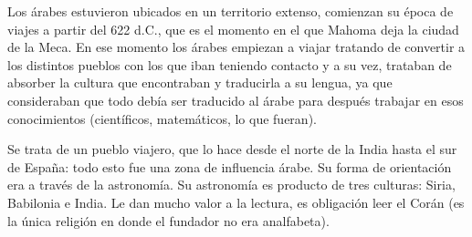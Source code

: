 Los árabes estuvieron ubicados en un territorio extenso, comienzan su época de viajes a partir del 622 d.C., que es el momento en el que Mahoma deja la ciudad de la Meca. En ese momento los árabes empiezan a viajar tratando de convertir a los distintos pueblos con los que iban teniendo contacto y a su vez, trataban de absorber la cultura que encontraban y traducirla a su lengua, ya que consideraban que todo debía ser traducido al árabe para después trabajar en esos conocimientos (científicos, matemáticos, lo que fueran). 

Se trata de un pueblo viajero, que lo hace desde el norte de la India hasta el sur de España: todo esto fue una zona de influencia árabe. Su forma de orientación era a través de la astronomía. Su astronomía es producto de tres culturas: Siria, Babilonia e India. Le dan mucho valor a la lectura, es obligación leer el Corán (es la única religión en donde el fundador no era analfabeta).
